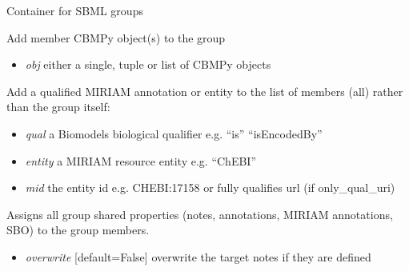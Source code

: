 \documentclass[a4paper,11pt,english]{sphinxmanual}
\begin{document}
\begin{fulllineitems}
\label{modules_doc:cbmpy.CBModel.Group}
Container for SBML groups

\begin{fulllineitems}
\label{modules_doc:cbmpy.CBModel.Group.addMember}
Add member CBMPy object(s) to the group
\begin{itemize}
\item {} 
\emph{obj} either a single, tuple or list of CBMPy objects

\end{itemize}

\end{fulllineitems}


\begin{fulllineitems}
\label{modules_doc:cbmpy.CBModel.Group.addSharedMIRIAMannotation}
Add a qualified MIRIAM annotation or entity to the list of members (all) rather than the group itself:
\begin{itemize}
\item {} 
\emph{qual} a Biomodels biological qualifier e.g. ``is'' ``isEncodedBy''

\item {} 
\emph{entity} a MIRIAM resource entity e.g. ``ChEBI''

\item {} 
\emph{mid} the entity id e.g. CHEBI:17158 or fully qualifies url (if only\_qual\_uri)

\end{itemize}

\end{fulllineitems}


\begin{fulllineitems}
\label{modules_doc:cbmpy.CBModel.Group.assignAllSharedPropertiesToMembers}
Assigns all group shared properties (notes, annotations, MIRIAM annotations, SBO) to the group members.
\begin{itemize}
\item {} 
\emph{overwrite} {[}default=False{]} overwrite the target notes if they are defined


\end{itemize}
\end{fulllineitems}
\end{fulllineitems}
\end{document}
